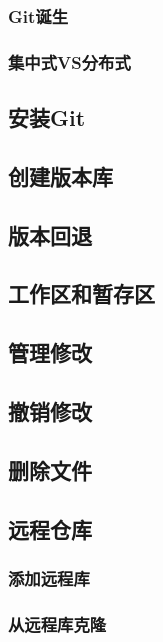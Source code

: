\documentclass[12pt]{article}
\begin{document}
\subsubsection{Git诞生}

\subsubsection{集中式VS分布式}

\subsection{安装Git}

\subsection{创建版本库}

\subsection{版本回退}

\subsection{工作区和暂存区}

\subsection{管理修改}

\subsection{撤销修改}

\subsection{删除文件}

\subsection{远程仓库}

\subsubsection{添加远程库}

\subsubsection{从远程库克隆}
\end{document}
